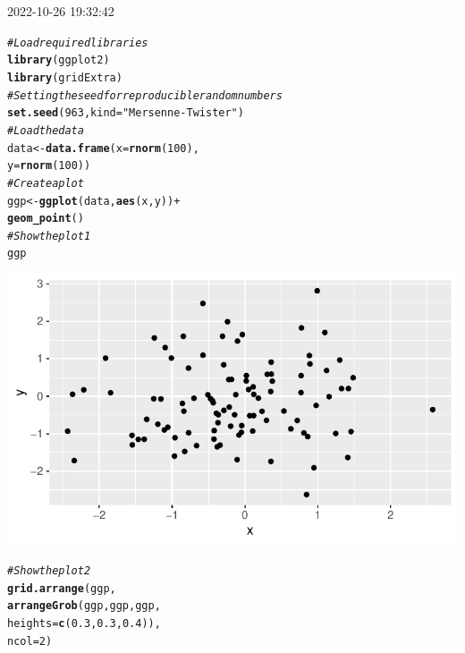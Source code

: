 \documentclass{article}\usepackage[]{graphicx}\usepackage[]{xcolor}
\makeatletter
\def\maxwidth{ %
  \ifdim\Gin@nat@width>\linewidth
    \linewidth
  \else
    \Gin@nat@width
  \fi
}
\newcommand{\hlnum}[1]{\textcolor[rgb]{0.686,0.059,0.569}{#1}}%
\newcommand{\hlstr}[1]{\textcolor[rgb]{0.192,0.494,0.8}{#1}}%
\newcommand{\hlcom}[1]{\textcolor[rgb]{0.678,0.584,0.686}{\textit{#1}}}%
\newcommand{\hlopt}[1]{\textcolor[rgb]{0,0,0}{#1}}%
\newcommand{\hlstd}[1]{\textcolor[rgb]{0.345,0.345,0.345}{#1}}%
\newcommand{\hlkwb}[1]{\textcolor[rgb]{0.69,0.353,0.396}{#1}}%
\newcommand{\hlkwc}[1]{\textcolor[rgb]{0.333,0.667,0.333}{#1}}%
\newcommand{\hlkwd}[1]{\textcolor[rgb]{0.737,0.353,0.396}{\textbf{#1}}}%
\newenvironment{kframe}{%
 \def\at@end@of@kframe{}%
 \ifinner\ifhmode%
  \def\at@end@of@kframe{\end{minipage}}%
  \begin{minipage}{\columnwidth}%
 \fi\fi%
 \def\FrameCommand##1{\hskip\@totalleftmargin \hskip-\fboxsep
 \colorbox{shadecolor}{##1}\hskip-\fboxsep
     \hskip-\linewidth \hskip-\@totalleftmargin \hskip\columnwidth}%
 \MakeFramed {\advance\hsize-\width
   \@totalleftmargin\z@ \linewidth\hsize
   \@setminipage}}%
 {\par\unskip\endMakeFramed%
 \at@end@of@kframe}
\newenvironment{knitrout}{}{} %
\makeatother
\begin{document}


2022-10-26 19:32:42
\begin{knitrout}
\color{fgcolor}\begin{kframe}
\begin{alltt}
\hlcom{# Load required libraries}
\hlkwd{library}\hlstd{(ggplot2)}
\hlkwd{library}\hlstd{(gridExtra)}
\hlcom{# Setting the seed for reproducible random numbers}
\hlkwd{set.seed}\hlstd{(}\hlnum{963}\hlstd{,} \hlkwc{kind} \hlstd{=} \hlstr{"Mersenne-Twister"}\hlstd{)}
\hlcom{# Load the data}
\hlstd{data} \hlkwb{<-} \hlkwd{data.frame}\hlstd{(}\hlkwc{x} \hlstd{=} \hlkwd{rnorm}\hlstd{(}\hlnum{100}\hlstd{),}
                   \hlkwc{y} \hlstd{=} \hlkwd{rnorm}\hlstd{(}\hlnum{100}\hlstd{))}
\hlcom{# Create a plot}
\hlstd{ggp} \hlkwb{<-} \hlkwd{ggplot}\hlstd{(data,} \hlkwd{aes}\hlstd{(x, y))} \hlopt{+}
  \hlkwd{geom_point}\hlstd{()}
\hlcom{# Show the plot 1}
\hlstd{ggp}
\end{alltt}
\end{kframe}

{\centering \includegraphics[width=\maxwidth]{figure/unnamed-chunk-1-1} 

}


\begin{kframe}\begin{alltt}
\hlcom{# Show the plot 2}
\hlkwd{grid.arrange}\hlstd{(ggp,}
             \hlkwd{arrangeGrob}\hlstd{(ggp, ggp, ggp,}
                           \hlkwc{heights} \hlstd{=} \hlkwd{c}\hlstd{(}\hlnum{0.3}\hlstd{,} \hlnum{0.3}\hlstd{,} \hlnum{0.4}\hlstd{)),}
               \hlkwc{ncol} \hlstd{=} \hlnum{2}\hlstd{)}
\end{alltt}
\end{kframe}


\end{knitrout}
\end{document}
